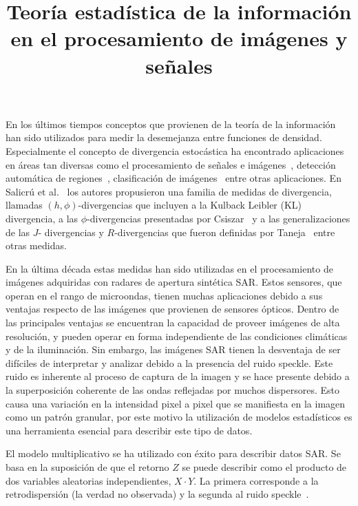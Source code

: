 \documentclass[11pt]{article}
\title{\textbf{Teoría estadística de la información \\en el procesamiento de imágenes y señales}}
\date{}
\begin{document}
	
	\maketitle

En los últimos tiempos conceptos que provienen de la teoría de la información han sido utilizados para medir la desemejanza entre funciones de densidad. Especialmente el concepto de divergencia estocástica ha encontrado aplicaciones en áreas tan diversas como el procesamiento de señales e imágenes~\cite {Aviyente2007}, detección automática de regiones~\cite{Nascimento2009,SilvaCribariFrery:ImprovedLikelihood:Environmetrics}, clasificación de imágenes~\cite{Puig2003} entre otras aplicaciones. 
En Salicrú et al.~\cite{Salicru1994} los autores propusieron una familia de medidas de divergencia, llamadas $(h,\phi)$-divergencias que incluyen a la Kulback Leibler (KL) divergencia, a las $\phi$-divergencias presentadas por Csiszar~\cite{Csiszar1967} y a las generalizaciones de las $J$- divergencias y $R$-divergencias que fueron definidas por Taneja~\cite{Taneja1989} entre otras medidas. 

En la última década estas medidas han sido utilizadas en el procesamiento de imágenes adquiridas con radares de apertura sintética SAR. Estos sensores, que operan en el rango de microondas, tienen muchas aplicaciones debido a sus ventajas respecto de las imágenes que provienen de sensores ópticos. Dentro de las principales ventajas se encuentran la capacidad de proveer imágenes de alta resolución, y pueden operar en forma independiente de las condiciones climáticas y de la iluminación. Sin embargo, las imágenes SAR tienen la desventaja de ser difíciles de interpretar y analizar debido a la presencia del ruido speckle. Este ruido es inherente al proceso de captura de la imagen y se hace presente debido a la superposición coherente de las ondas reflejadas por
muchos dispersores. Esto causa una variación en la intensidad pixel a pixel que se manifiesta en la imagen como un patrón granular, por este motivo la utilización de modelos estadísticos es una herramienta esencial para describir este tipo de datos.

El modelo multiplicativo se ha utilizado con éxito para describir datos SAR. Se basa en la suposición de que el retorno $Z$ se puede describir como el producto de dos variables aleatorias independientes, $X\cdot Y$. La primera corresponde a la retrodispersión (la verdad no observada) y la segunda al ruido speckle~\cite{oliverquegan98}.
\end{document}
